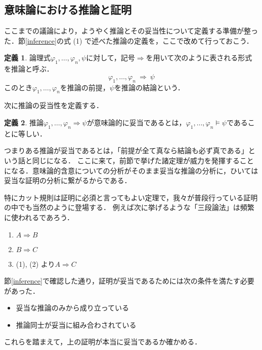 \documentclass[uplatex,a4paper,dvipdfmx]{jsarticle}
\theoremstyle{definition}
\newtheorem{dfn}{定義}
\begin{document}
        \subsection{意味論における推論と証明}
            ここまでの議論により，ようやく推論とその妥当性について定義する準備が整った．節\ref{inference}の式 (1) で述べた推論の定義を，ここで改めて行っておこう．
            \begin{dfn}
                論理式$\varphi_1, \ldots, \varphi_n, \psi$に対して，記号$\Rightarrow$を用いて次のように表される形式を推論と呼ぶ．
                \begin{equation}
                    \varphi_1, \ldots, \varphi_n\ \Longrightarrow\ \psi
                \end{equation}
                このとき$\varphi_1, \ldots, \varphi_n$を推論の前提，$\psi$を推論の結論という．
            \end{dfn}

            次に推論の妥当性を定義する．
            \begin{dfn}\label{dfn:validinference}
                推論$\varphi_1, \ldots, \varphi_n \Longrightarrow \psi$が意味論的に妥当であるとは，$\varphi_1, \ldots, \varphi_n \vDash \psi$であることに等しい．
            \end{dfn}


            つまりある推論が妥当であるとは，「前提が全て真なら結論も必ず真である」という話と同じになる．
            ここに来て，前節で挙げた諸定理が威力を発揮することになる．意味論的含意についての分析がそのまま妥当な推論の分析に，ひいては妥当な証明の分析に繋がるからである．

            特にカット規則は証明に必須と言ってもよい定理で，我々が普段行っている証明の中でも当然のように登場する．
            例えば次に挙げるような「三段論法」は頻繁に使われるであろう．

            \begin{enumerate}
                \item $A \Longrightarrow B$
                \item $B \Longrightarrow C$
                \item (1), (2) より$A \Longrightarrow C$
            \end{enumerate}

            節\ref{inference}で確認した通り，証明が妥当であるためには次の条件を満たす必要があった．
            \begin{itemize}
                \item 妥当な推論のみから成り立っている
                \item 推論同士が妥当に組み合わされている
            \end{itemize}
            これらを踏まえて，上の証明が本当に妥当であるか確かめる．
\end{document}
